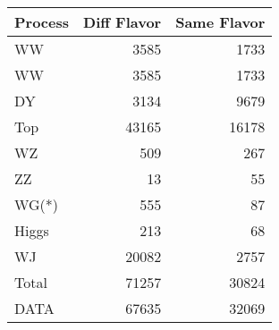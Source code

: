 \begin{table}[ht]
	\centering
\begin{tabular}{lrr}

Process &  Diff Flavor &  Same Flavor \\
		\hline
     WW &         3585 &         1733 \\
     WW &         3585 &         1733 \\
     DY &         3134 &         9679 \\
    Top &        43165 &        16178 \\
     WZ &          509 &          267 \\
     ZZ &           13 &           55 \\
  WG(*) &          555 &           87 \\
  Higgs &          213 &           68 \\
     WJ &        20082 &         2757 \\
\hline
  Total &        71257 &        30824 \\
   DATA &        67635 &        32069 \\


\end{tabular}

\end{table}